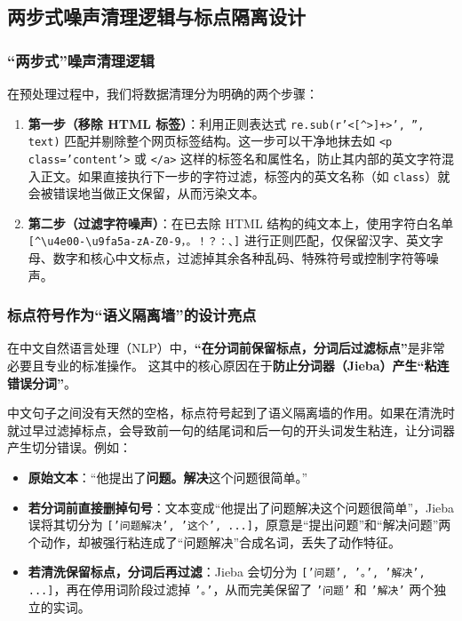 \documentclass[UTF8,a4paper,11pt]{ctexart}
\begin{document}
\subsection{两步式噪声清理逻辑与标点隔离设计}

\subsubsection{“两步式”噪声清理逻辑}
在预处理过程中，我们将数据清理分为明确的两个步骤：
\begin{enumerate}
    \item \textbf{第一步（移除 HTML 标签）}：利用正则表达式 \texttt{re.sub(r'<[\^{}>]+>', '', text)} 匹配并剔除整个网页标签结构。这一步可以干净地抹去如 \texttt{<p class='content'>} 或 \texttt{</a>} 这样的标签名和属性名，防止其内部的英文字符混入正文。如果直接执行下一步的字符过滤，标签内的英文名称（如 \texttt{class}）就会被错误地当做正文保留，从而污染文本。
    \item \textbf{第二步（过滤字符噪声）}：在已去除 HTML 结构的纯文本上，使用字符白名单 \texttt{[^\textbackslash u4e00-\textbackslash u9fa5a-zA-Z0-9，。！？：、]} 进行正则匹配，仅保留汉字、英文字母、数字和核心中文标点，过滤掉其余各种乱码、特殊符号或控制字符等噪声。
\end{enumerate}

\subsubsection{标点符号作为“语义隔离墙”的设计亮点}
在中文自然语言处理（NLP）中，\textbf{“在分词前保留标点，分词后过滤标点”}是非常必要且专业的标准操作。
这其中的核心原因在于\textbf{防止分词器（Jieba）产生“粘连错误分词”}。

中文句子之间没有天然的空格，标点符号起到了语义隔离墙的作用。如果在清洗时就过早过滤掉标点，会导致前一句的结尾词和后一句的开头词发生粘连，让分词器产生切分错误。例如：
\begin{itemize}
    \item \textbf{原始文本}：“他提出了\textbf{问题。解决}这个问题很简单。”
    \item \textbf{若分词前直接删掉句号}：文本变成“他提出了问题解决这个问题很简单”，Jieba 误将其切分为 \texttt{['问题解决', '这个', ...]}，原意是“提出问题”和“解决问题”两个动作，却被强行粘连成了“问题解决”合成名词，丢失了动作特征。
    \item \textbf{若清洗保留标点，分词后再过滤}：Jieba 会切分为 \texttt{['问题', '。', '解决', ...]}，再在停用词阶段过滤掉 \texttt{'。'}，从而完美保留了 \texttt{'问题'} 和 \texttt{'解决'} 两个独立的实词。
\end{itemize}
\end{document}

